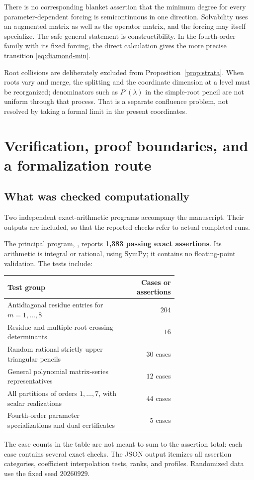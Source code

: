 \documentclass[11pt,a4paper]{article}
\numberwithin{equation}{section}
\theoremstyle{definition}
\theoremstyle{remark}
\theoremstyle{definition}
\begin{document}
There is no corresponding blanket assertion that the minimum degree for every parameter-dependent forcing is semicontinuous in one direction. Solvability uses an augmented matrix as well as the operator matrix, and the forcing may itself specialize. The safe general statement is constructibility. In the fourth-order family with its fixed forcing, the direct calculation gives the more precise transition \eqref{eq:diamond-min}.

Root collisions are deliberately excluded from Proposition~\ref{prop:strata}. When roots vary and merge, the splitting and the coordinate dimension at a level must be reorganized; denominators such as $P'(\lambda)$ in the simple-root pencil are not uniform through that process. That is a separate confluence problem, not resolved by taking a formal limit in the present coordinates.

\section{Verification, proof boundaries, and a formalization route}
\label{sec:verification}

\subsection{What was checked computationally}
Two independent exact-arithmetic programs accompany the manuscript. Their outputs are included, so that the reported checks refer to actual completed runs.

The principal program, , reports \textbf{1,383 passing exact assertions}. Its arithmetic is integral or rational, using SymPy; it contains no floating-point validation. The tests include:
\begin{center}\small
\begin{tabular}{p{0.68\linewidth}r}
\toprule
Test group & Cases or assertions\\
\midrule
Antidiagonal residue entries for $m=1,\ldots,8$ & $204$\\
Residue and multiple-root crossing determinants & $16$\\
Random rational strictly upper triangular pencils & $30$ cases\\
General polynomial matrix-series representatives & $12$ cases\\
All partitions of orders $1,\ldots,7$, with scalar realizations & $44$ cases\\
Fourth-order parameter specializations and dual certificates & $5$ cases\\
\bottomrule
\end{tabular}
\end{center}
The case counts in the table are not meant to sum to the assertion total: each case contains several exact checks. The JSON output itemizes all assertion categories, coefficient interpolation tests, ranks, and profiles. Randomized data use the fixed seed $20260929$.
\end{document}
